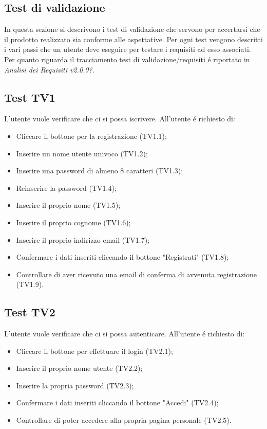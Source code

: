 \newpage

\subsection{Test di validazione}
In questa sezione si descrivono i test di validazione che servono per accertarsi che il prodotto realizzato sia conforme alle aspettative.
Per ogni test vengono descritti i vari passi che un utente deve eseguire per testare i requisiti ad esso associati. Per quanto riguarda il tracciamento test di validazione/requisiti \'e riportato in \textit{Analisi dei Requisiti v2.0.0?}.

\subsection{Test TV1}
L'utente vuole verificare che ci si possa iscrivere. \newline
All'utente \'e richiesto di:
\begin{itemize}
	\item Cliccare il bottone per la registrazione (TV1.1);
	\item Inserire un nome utente univoco (TV1.2);
	\item Inserire una password di almeno 8 caratteri (TV1.3);
	\item Reinserire la password (TV1.4);
	\item Inserire il proprio nome (TV1.5);
	\item Inserire il proprio cognome (TV1.6);
	\item Inserire il proprio indirizzo email (TV1.7);
	\item Confermare i dati inseriti cliccando il bottone "Registrati" (TV1.8);
	\item Controllare di aver ricevuto una email di conferma di avvenuta registrazione (TV1.9).
\end{itemize}

\subsection{Test TV2}
L'utente vuole verificare che ci si possa autenticare. \newline
All'utente \'e richiesto di:
\begin{itemize}
	\item Cliccare il bottone per effettuare il login (TV2.1);
	\item Inserire il proprio nome utente (TV2.2);
	\item Inserire la propria password (TV2.3);
	\item Confermare i dati inseriti cliccando il bottone "Accedi" (TV2.4);
	\item Controllare di poter accedere alla propria pagina personale (TV2.5).
\end{itemize}

